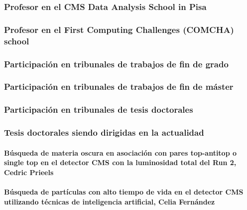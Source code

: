 \documentclass[a4paper, 11pt, twoside, openright]{report}
\begin{document}
\subsubsection{Profesor en el CMS Data Analysis School in Pisa}


\subsubsection{Profesor en el First Computing Challenges (COMCHA) school}


\subsubsection{Participación en tribunales de trabajos de fin de grado}


\subsubsection{Participación en tribunales de trabajos de fin de máster}


\subsubsection{Participación en tribunales de tesis doctorales}



\subsubsection{Tesis doctorales siendo dirigidas en la actualidad}

\paragraph{Búsqueda de materia oscura en asociación con pares top-antitop o single top en el detector CMS con la luminosidad total del Run 2, Cedric Prieels}


\paragraph{Búsqueda de partículas con alto tiempo de vida en el detector CMS utilizando técnicas de inteligencia artificial, Celia Fernández}

\end{document}

